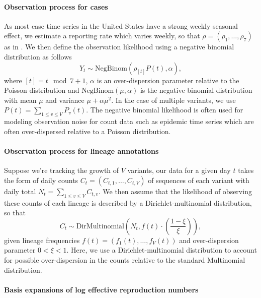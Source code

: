 \documentclass[11pt,oneside,letterpaper]{article}
\begin{document}
\paragraph{Observation process for cases}%

As most case time series in the United States have a strong weekly seasonal effect, we estimate a reporting rate which varies weekly, so that $\rho = (\rho_{1}, \ldots, \rho_{7})$ as in \cite{Abbott2020}.
We then define the observation likelihood using a negative binomial distribution as follows
\begin{equation}
  Y_{t} \sim \text{NegBinom}(\rho_{[t]} P(t),  \alpha),
\end{equation}
where $[t] = t \mod 7 + 1$, $\alpha$ is an over-dispersion parameter relative to the Poisson distribution and $\text{NegBinom}(\mu, \alpha)$ is the negative binomial distribution with mean $\mu$ and variance  $\mu + \alpha\mu^{2}$. In the case of multiple variants, we use $P(t) = \sum_{1\leq v \leq V} P_{v}(t)$.
The negative binomial likelihood is often used for modeling observation noise for count data such as epidemic time series which are often over-dispersed relative to a Poisson distribution. %

\paragraph{Observation process for lineage annotations}%

Suppose we're tracking the growth of $V$ variants, our data for a given day $t$ takes the form of daily counts $C_{t} = (C_{t,1}, \ldots, C_{t,V})$ of sequences of each variant with daily total $N_{t} = \sum_{1\leq v \leq V} C_{t, v}$.
We then assume that the likelihood of observing these counts of each lineage is described by a Dirichlet-multinomial distribution, so that
\begin{equation}
    C_{t} \sim \text{DirMultinomial}\left(N_{t}, f(t)\cdot \left(\frac{1-\xi}{\xi}\right)\right),
\end{equation}
given lineage frequencies $f(t) = (f_{1}(t), \ldots, f_{V}(t))$ and over-dispersion parameter $0<\xi<1$.
Here, we use a Dirichlet-multinomial distribution to account for possible over-dispersion in the counts relative to the standard Multinomial distribution.

\paragraph{Basis expansions of log effective reproduction numbers}%
\end{document}
